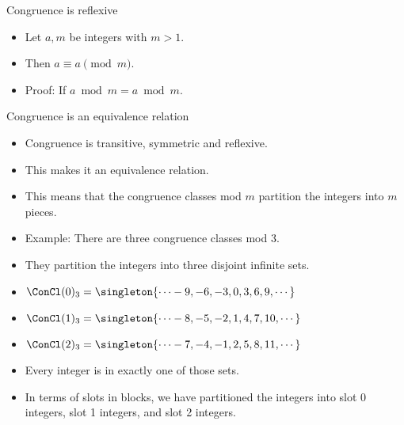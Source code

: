 \documentclass{beamer}
\begin{document}
\begin{frame}{Congruence is reflexive}

\begin{itemize}
  \item  Let $a, m$ be integers with $m>1$.
  \item Then $a\equiv a \pmod m$.
  \item Proof: If $a \bmod m = a \bmod m$.
\end{itemize}

\end{frame}

\begin{frame}{Congruence is an equivalence relation}

\begin{itemize}
  \item  Congruence is transitive, symmetric and reflexive.
  \item This makes it an equivalence relation.
  \item This means that the congruence classes mod $m$ partition the integers into $m$ pieces.
  \item Example: There are three congruence classes mod 3.
  \item They partition the integers into three disjoint infinite sets.
  \item $\ConCl(0)_3 = \singleton{\cdots -9, -6, -3, 0, 3, 6, 9,\cdots}$
  \item $\ConCl(1)_3 = \singleton{\cdots -8, -5, -2, 1, 4, 7, 10,\cdots}$
  \item $\ConCl(2)_3 = \singleton{\cdots -7, -4, -1, 2, 5, 8, 11,\cdots}$
  \item Every integer is in exactly one of those sets.
  \item In terms of slots in blocks, we have partitioned the integers into slot 0 integers,
  slot 1 integers, and slot 2 integers.
\end{itemize}

\end{frame}
\end{document}
